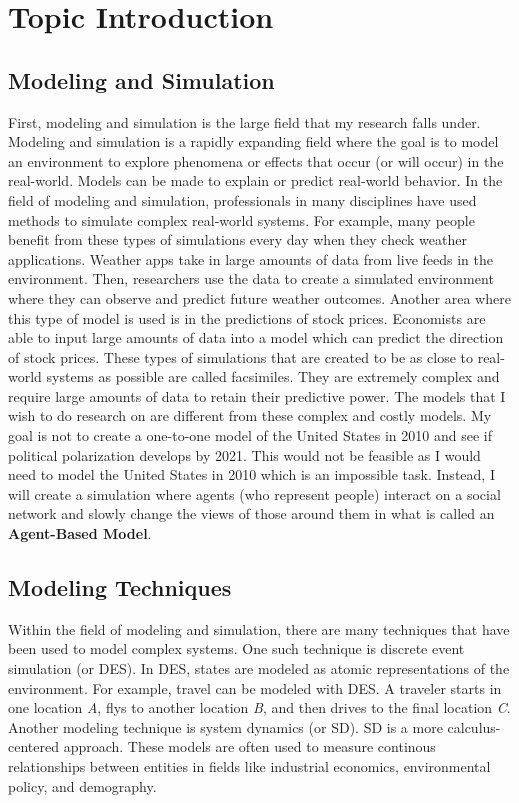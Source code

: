 \section{Topic Introduction}

\subsection{Modeling and Simulation}
First, modeling and simulation is the large field that my research falls under. Modeling and simulation is a rapidly expanding field where the goal is to model an environment to explore phenomena or effects that occur (or will occur) in the real-world. Models can be made to explain or predict real-world behavior. In the field of modeling and simulation, professionals in many disciplines have used methods to simulate complex real-world systems. For example, many people benefit from these types of simulations every day when they check weather applications. Weather apps take in large amounts of data from live feeds in the environment. Then, researchers use the data to create a simulated environment where they can observe and predict future weather outcomes. Another area where this type of model is used is in the predictions of stock prices. Economists are able to input large amounts of data into a model which can predict the direction of stock prices. These types of simulations that are created to be as close to real-world systems as possible are called facsimiles. They are extremely complex and require large amounts of data to retain their predictive power. The models that I wish to do research on are different from these complex and costly models. My goal is not to create a one-to-one model of the United States in 2010 and see if political polarization develops by 2021. This would not be feasible as I would need to model the United States in 2010 which is an impossible task. Instead, I will create a simulation where agents (who represent people) interact on a social network and slowly change the views of those around them in what is called an \textbf{Agent-Based Model}.  

\subsection{Modeling Techniques}
Within the field of modeling and simulation, there are many techniques that have been used to model complex systems. One such technique is discrete event simulation (or DES). In DES, states are modeled as atomic representations of the environment. For example, travel can be modeled with DES. A traveler starts in one location \textit{A}, flys to another location \textit{B}, and then drives to the final location \textit{C}. Another modeling technique is system dynamics (or SD). SD is a more calculus-centered approach. These models are often used to measure continous relationships between entities in fields like industrial economics, environmental policy, and demography.

